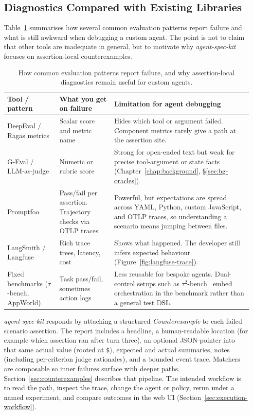 \subsection{Diagnostics Compared with Existing Libraries}

Table~\ref{tab:diagnostics-comparison} summarises how several common evaluation patterns report failure and what is still awkward when debugging a custom agent. The point is not to claim that other tools are inadequate in general, but to motivate why \emph{agent-spec-kit} focuses on assertion-local counterexamples.

\begin{table}[htbp]
\centering
\small
\renewcommand{\arraystretch}{1.2}
\begin{tabularx}{\textwidth}{p{}p{}X}
\toprule
\textbf{Tool / pattern} & \textbf{What you get on failure} & \textbf{Limitation for agent debugging} \\
\midrule
DeepEval / Ragas metrics &
Scalar score and metric name &
Hides which tool or argument failed. Component metrics rarely give a path at the assertion site. \\
G-Eval / LLM-as-judge &
Numeric or rubric score &
Strong for open-ended text but weak for precise tool-argument or state facts (Chapter~\ref{chap:background}, \S\ref{sec:bg-oracles}). \\
Promptfoo &
Pass/fail per assertion. Trajectory checks via OTLP traces &
Powerful, but expectations are spread across YAML, Python, custom JavaScript, and OTLP traces, so understanding a scenario means jumping between files. \\
LangSmith / Langfuse &
Rich trace trees, latency, cost &
Shows what happened. The developer still infers expected behaviour (Figure~\ref{fig:langfuse-trace}). \\
Fixed benchmarks ($\tau$-bench, AppWorld) &
Task pass/fail, sometimes action logs &
Less reusable for bespoke agents. Dual-control setups such as $\tau^2$-bench~\citep{barres2025tau2} embed orchestration in the benchmark rather than a general test DSL. \\
\bottomrule
\end{tabularx}
\caption{How common evaluation patterns report failure, and why assertion-local diagnostics remain useful for custom agents.}
\label{tab:diagnostics-comparison}
\end{table}

\emph{agent-spec-kit} responds by attaching a structured \emph{Counterexample} to each failed scenario assertion. The report includes a headline, a human-readable location (for example which assertion ran after turn three), an optional JSON-pointer into that same actual value (rooted at \texttt{\$}), expected and actual summaries, notes (including per-criterion judge rationales), and a bounded event trace. Matchers are composable so inner failures surface with deeper paths. Section~\ref{sec:counterexamples} describes that pipeline. The intended workflow is to read the path, inspect the trace, change the agent or policy, rerun under a named experiment, and compare outcomes in the web UI (Section~\ref{sec:execution-workflow}).
